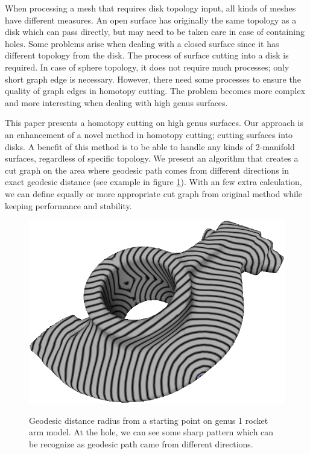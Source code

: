 \documentclass[a4paper,twoside]{article}
\begin{document}
When processing a mesh that requires disk topology input, all kinds of meshes have different measures. An open surface has originally the same topology as a disk which can pass directly, but may need to be taken care in case of containing holes. Some problems arise when dealing with a closed surface since it has different topology from the disk. The process of surface cutting into a disk is required. In case of sphere topology, it does not require much processes; only short graph edge is necessary. However, there need some processes to ensure the quality of graph edges in homotopy cutting. The problem becomes more complex and more interesting when dealing with high genus surfaces. 
   
This paper presents a homotopy cutting on high genus surfaces. Our approach is an enhancement of a novel method \cite{Gu:2002:GI:566654.566589} in homotopy cutting; cutting surfaces into disks. A benefit of this method is to be able to handle any kinds of 2-manifold surfaces, regardless of specific topology. We present an algorithm that creates a cut graph on the area where geodesic path comes from different directions in exact geodesic distance \cite{Mitchell:1987:DGP:33367.33372,Surazhsky:2005:FEA:1073204.1073228} (see example in figure \ref{fig:geodesic rocket arm}). With an few extra calculation,  we can define equally or more appropriate cut graph from original method while keeping performance and stability.
\begin{figure}[!h]
	\centering
	{\includegraphics[width=0.9\columnwidth]{images/geodesic_rocket-arm.png}}
	\caption{Geodesic distance radius from a starting point on genus 1 rocket arm model. At the hole, we can see some sharp pattern which can be recognize as geodesic path came from different directions.}
	\label{fig:geodesic rocket arm}
\end{figure}
\end{document}
